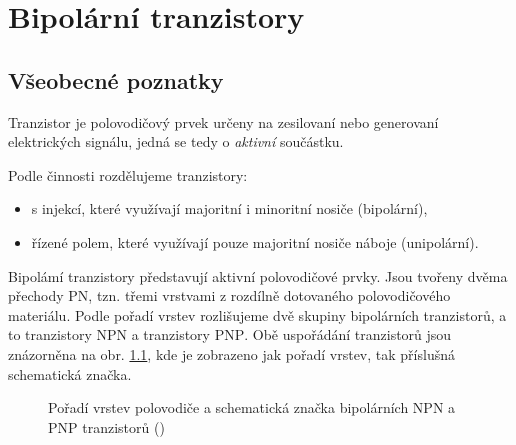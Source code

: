 \setchaptertoc
\chapter{Bipolární tranzistory}\label{es:IchapV}
  \section{Všeobecné poznatky}\label{es:IchapVsecI}
    Tranzistor je polovodičový prvek určeny na zesilovaní nebo generovaní elektrických signálu,
    jedná se tedy o \emph{aktivní} součástku.

    Podle činnosti rozdělujeme tranzistory: 
    \begin{itemize}[noitemsep]
      \item s injekcí, které využívají majoritní i minoritní nosiče (bipolární),
      \item řízené polem, které využívají pouze majoritní nosiče náboje (unipolární).
    \end{itemize}
     
    Bipolámí tranzistory představují aktivní polovodičové prvky. Jsou tvořeny dvěma přechody PN,
    tzn. třemi vrstvami z rozdílně dotovaného polovodičového materiálu. Podle pořadí vrstev
    rozlišujeme dvě skupiny bipolárních tranzistorů, a to tranzistory \textsc{NPN} a tranzistory
    \textsc{PNP}. Obě uspořádání tranzistorů jsou znázorněna na obr. \ref{teo:fig053}, kde je
    zobrazeno jak pořadí vrstev, tak příslušná schematická značka.

    \begin{figure}[ht!]
      \centering  
       \hspace{1em}
       \newline
                   \hspace{1em}
      \caption{Pořadí vrstev polovodiče a schematická značka bipolárních NPN a PNP 
      tranzistorů (\cite[s.~112]{Frohn2006})}
      \label{teo:fig053}
    \end{figure}
    
